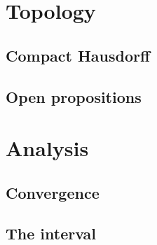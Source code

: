 \documentclass{../util/zariski-small}
\begin{document}
\section{Topology}

\subsection{Compact Hausdorff}



\subsection{Open propositions}


\section{Analysis}

\subsection{Convergence}



\subsection{The interval}
%


\printbibliography
\end{document}
